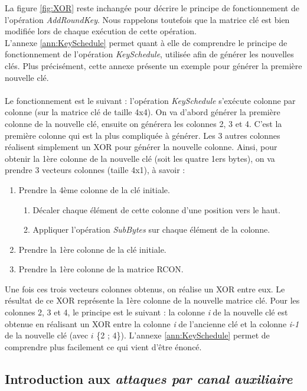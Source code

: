 \documentclass[10pt, oneside, a4paper]{article}
\begin{document}
\begin{description}
La figure \ref{fig:XOR} reste inchangée pour décrire le principe de fonctionnement de l'opération \textit{AddRoundKey}. Nous rappelons toutefois que la matrice clé est bien modifiée lors de chaque exécution de cette opération. \\
L'annexe \ref{ann:KeySchedule} permet quant à elle de comprendre le principe de fonctionnement de l'opération \textit{KeySchedule}, utilisée afin de générer les nouvelles clés. Plus précisément, cette annexe présente un exemple pour générer la première nouvelle clé. \\ \\
Le fonctionnement est le suivant : l'opération \textit{KeySchedule} s'exécute colonne par colonne (sur la matrice clé de taille 4x4). On va d'abord générer la première colonne de la nouvelle clé, ensuite on générera les colonnes 2, 3 et 4. C'est la première colonne qui est la plus compliquée à générer. Les 3 autres colonnes réalisent simplement un XOR pour générer la nouvelle colonne.
Ainsi, pour obtenir la 1ère colonne de la nouvelle clé (soit les quatre 1ers bytes), on va prendre 3 vecteurs colonnes (taille 4x1), à savoir : 
\begin{enumerate}
\item Prendre la 4ème colonne de la clé initiale.
\begin{enumerate}
\item Décaler chaque élément de cette colonne d'une position vers le haut.
\item Appliquer l'opération \textit{SubBytes} sur chaque élément de la colonne.
\end{enumerate}
\item Prendre la 1ère colonne de la clé initiale.
\item Prendre la 1ère colonne de la matrice RCON.
\end{enumerate}
Une fois ces trois vecteurs colonnes obtenus, on réalise un XOR entre eux. Le résultat de ce XOR représente la 1ère colonne de la nouvelle matrice clé. Pour les colonnes 2, 3 et 4, le principe est le suivant : la colonne \textit{i} de la nouvelle clé est obtenue en réalisant un XOR entre la colonne \textit{i} de l'ancienne clé et la colonne \textit{i-1} de la nouvelle clé (avec $i$ {\epsilon} \{2 ; 4\}). L'annexe \ref{ann:KeySchedule} permet de comprendre plus facilement ce qui vient d'être énoncé. 

\end{description}


\newpage

\subsection{Introduction aux \textit{attaques par canal auxiliaire}}
\label{sec:att}
\end{document}
